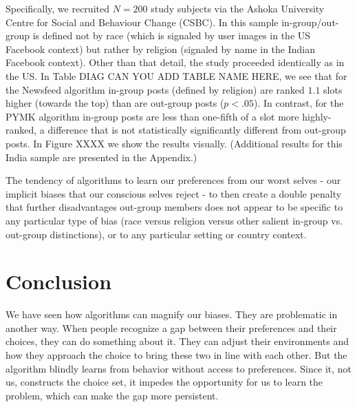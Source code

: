 \documentclass[12pt,letterpaper]{article}
\begin{document}
Specifically, we recruited $N=200$ study subjects via the Ashoka University Centre for Social and Behaviour Change (CSBC). In this sample in-group/out-group is defined not by race (which is signaled by user images in the US Facebook context) but rather by religion (signaled by name in the Indian Facebook context). Other than that detail, the study proceeded identically as in the US. In Table DIAG CAN YOU ADD TABLE NAME HERE, we see that for the Newsfeed algorithm in-group posts (defined by religion) are ranked $1.1$ slots higher (towards the top) than are out-group posts ($p<.05$). In contrast, for the PYMK algorithm in-group posts are less than one-fifth of a slot more highly-ranked, a difference that is not statistically significantly different from out-group posts. In Figure XXXX we show the results visually. (Additional results for this India sample are presented in the Appendix.)

The tendency of algorithms to learn our preferences from our worst selves - our implicit biases that our conscious selves reject - to then create a double penalty that further disadvantages out-group members does not appear to be specific to any particular type of bias (race versus religion versus other salient in-group vs. out-group distinctions), or to any particular setting or country context.

\section{Conclusion}
We have seen how algorithms can magnify our biases. They are problematic in another way. When people recognize a gap between their preferences and their choices, they can do something about it. They can adjust their environments and how they approach the choice to bring these two in line with each other. But the algorithm blindly learns from behavior without access to preferences. Since it, not us, constructs the choice set, it impedes the opportunity for us to learn the problem, which can make the gap more persistent.

\pagebreak
\clearpage
\singlespacing 



\clearpage
\pagebreak

\end{document}
